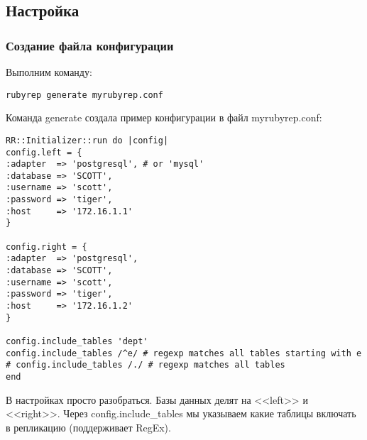 \subsection{Настройка}
\subsubsection{Создание файла конфигурации}
Выполним команду:
\begin{verbatim}
rubyrep generate myrubyrep.conf
\end{verbatim}

Команда generate создала пример конфигурации в файл myrubyrep.conf:
\begin{verbatim}
RR::Initializer::run do |config|
config.left = {
:adapter  => 'postgresql', # or 'mysql'
:database => 'SCOTT',
:username => 'scott',
:password => 'tiger',
:host     => '172.16.1.1'
}
 
config.right = {
:adapter  => 'postgresql',
:database => 'SCOTT',
:username => 'scott',
:password => 'tiger',
:host     => '172.16.1.2'
}
 
config.include_tables 'dept'
config.include_tables /^e/ # regexp matches all tables starting with e
# config.include_tables /./ # regexp matches all tables
end
\end{verbatim}

В настройках просто разобраться. Базы данных делят на <<left>> и <<right>>.
Через config.include\_tables мы указываем какие таблицы включать в репликацию (поддерживает RegEx).
